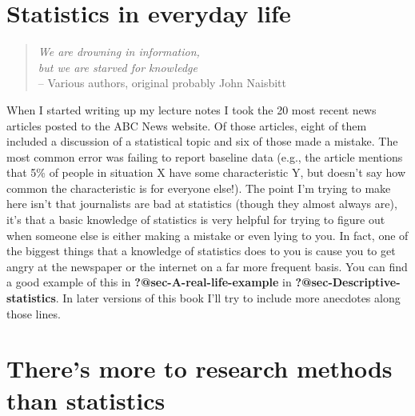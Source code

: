 \documentclass[
  a4paper,
]{book}
\begin{document}
\section{Statistics in everyday life}\label{statistics-in-everyday-life}

\begin{quote}
\emph{We are drowning in information,}\\
\emph{but we are starved for knowledge}\\
-- Various authors, original probably John Naisbitt
\end{quote}

When I started writing up my lecture notes I took the 20 most recent
news articles posted to the ABC News website. Of those articles, eight
of them included a discussion of a statistical topic and six of those
made a mistake. The most common error was failing to report baseline
data (e.g., the article mentions that 5\% of people in situation X have
some characteristic Y, but doesn't say how common the characteristic is
for everyone else!). The point I'm trying to make here isn't that
journalists are bad at statistics (though they almost always are), it's
that a basic knowledge of statistics is very helpful for trying to
figure out when someone else is either making a mistake or even lying to
you. In fact, one of the biggest things that a knowledge of statistics
does to you is cause you to get angry at the newspaper or the internet
on a far more frequent basis. You can find a good example of this in
\textbf{?@sec-A-real-life-example} in
\textbf{?@sec-Descriptive-statistics}. In later versions of this book
I'll try to include more anecdotes along those lines.

\section{There's more to research methods than
statistics}\label{theres-more-to-research-methods-than-statistics}
\end{document}
